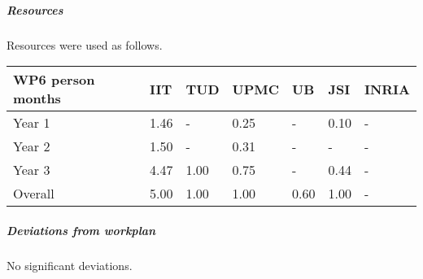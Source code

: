 

\subparagraph{Resources}

Resources were used as follows.

\begin{center}
\begin{tabular}{|C{1.5cm}|C{1.5cm}|C{1.5cm}|C{2cm}|C{2cm}|C{2cm}|C{2cm}|}
\hline
\footnotesize \textbf{WP6 person months}& \footnotesize \textbf{IIT}&\footnotesize \textbf{TUD}&\footnotesize \textbf{UPMC}& \footnotesize \textbf{UB} &\footnotesize \textbf{JSI} & \footnotesize \textbf{INRIA} \\ \hline
\footnotesize Year 1 &  1.46 & - & 0.25 & - & 0.10 & -    \\  \hline
\footnotesize Year 2 &  1.50 & - & 0.31 & - & - & -     \\  \hline
\footnotesize Year 3 &  4.47 & 1.00 & 0.75 & - & 0.44 & - \\  
\hline \hline
\footnotesize Overall &  5.00 & 1.00 & 1.00 & 0.60 & 1.00 & - \\ \hline
\end{tabular}
\end{center}

\subparagraph{Deviations from workplan} 
No significant deviations. 
